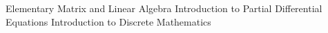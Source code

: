 \documentclass[a4paper]{cv-friggeri}
\begin{document}
\begin{aside}
Elementary Matrix and Linear Algebra
\vspace{0.2em}Introduction to Partial Differential Equations
\vspace{0.2em}Introduction to Discrete Mathematics
\end{aside}



\end{document}
